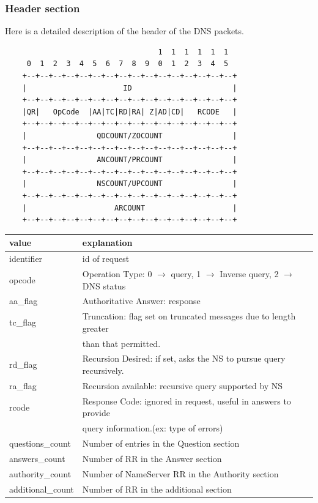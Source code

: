 \subsubsection{Header section}
Here is a detailed description of the header of the DNS packets. 
\begin{verbatim}
	                               1  1  1  1  1  1
	 0  1  2  3  4  5  6  7  8  9  0  1  2  3  4  5
	+--+--+--+--+--+--+--+--+--+--+--+--+--+--+--+--+
	|                      ID                       |
	+--+--+--+--+--+--+--+--+--+--+--+--+--+--+--+--+
	|QR|   OpCode  |AA|TC|RD|RA| Z|AD|CD|   RCODE   |
	+--+--+--+--+--+--+--+--+--+--+--+--+--+--+--+--+
	|                QDCOUNT/ZOCOUNT                |
	+--+--+--+--+--+--+--+--+--+--+--+--+--+--+--+--+
	|                ANCOUNT/PRCOUNT                |
	+--+--+--+--+--+--+--+--+--+--+--+--+--+--+--+--+
	|                NSCOUNT/UPCOUNT                |
	+--+--+--+--+--+--+--+--+--+--+--+--+--+--+--+--+
	|                    ARCOUNT                    |
	+--+--+--+--+--+--+--+--+--+--+--+--+--+--+--+--+

\end{verbatim}

\begin{tabular}{l|l}
value & explanation \\
\hline
identifier & id of request\\
\hline
opcode & Operation Type: 0 $\rightarrow$ query, 1 $\rightarrow$ Inverse query, 2 $\rightarrow$ DNS status\\
\hline
aa\_flag & Authoritative Answer: response \\
\hline
tc\_flag & Truncation: flag set on truncated messages due to length greater\\ & than that permitted.\\
\hline
rd\_flag & Recursion Desired: if set, asks the NS to pursue query recursively.\\
\hline
ra\_flag & Recursion available: recursive query supported by NS\\
\hline
rcode  & Response Code: ignored in request, useful in answers to provide\\ & query information.(ex: type of errors)\\
\hline
questions\_count  & Number of entries in the Question section\\
\hline
answers\_count  & Number of RR in the Answer section\\
\hline
authority\_count  & Number of NameServer RR in the Authority section\\
\hline
additional\_count  & Number of RR in the additional section\\
\hline
\end{tabular}



